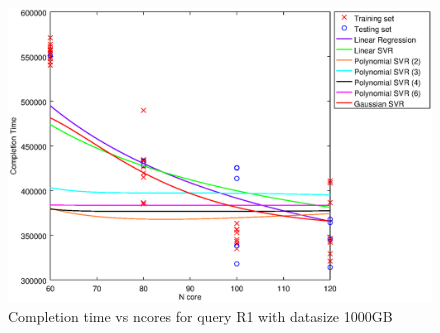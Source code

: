 
\begin {figure}[hbtp]
\centering
\includegraphics[width=\textwidth]{output/R1_1000_1_OVER_NCORES/plot_R1_1000.eps}
\caption{Completion time vs ncores for query R1 with datasize 1000GB}
\label{fig:all_nonlinear_R1_1000}
\end {figure}
